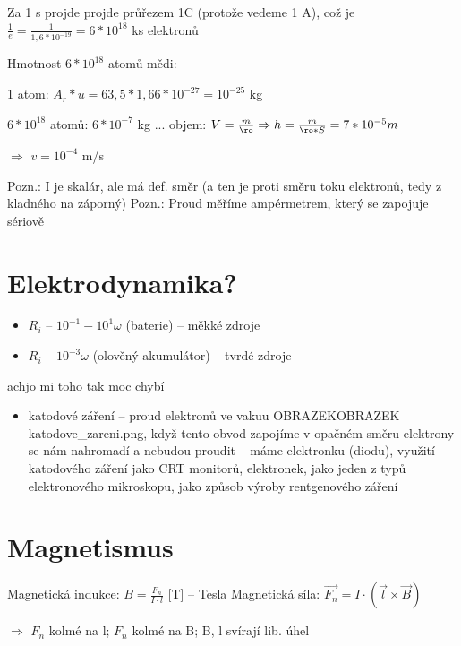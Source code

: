 \documentclass{article}
\begin{document}
Za 1 s projde projde průřezem 1C (protože vedeme 1 A), což je $\frac{1}{e} = \frac{1}{1,6* 10^{-19}} = 6* 10^{18}$ ks elektronů

Hmotnost $6*10^{18}$ atomů mědi:

  \hspace{10 px} 1 atom: $A_r * u = 63,5 * 1,66 * 10^{-27} = 10^{-25}$ kg

  \hspace{10 px} $6* 10^{18}$ atomů: $6* 10^{-7}$ kg ... objem: $V = \frac{m}{\ro} \Rightarrow h = \frac{m}{\ro*S} = 7* 10^{-5} m$

\hspace{-10 px} $\Rightarrow$ $v = 10^{-4} $ m/s

Pozn.: I je skalár, ale má def. směr (a ten je proti směru toku elektronů, tedy z kladného na záporný)
Pozn.: Proud měříme ampérmetrem, který se zapojuje sériově

\part{Elektrodynamika?}
\begin{itemize}
  \item $R_i$ -- $10^{-1} - 10^{1} \omega$ (baterie) -- měkké zdroje
  \item $R_i$ -- $10^{-3} \omega$ (olověný akumulátor) -- tvrdé zdroje
\end{itemize}

achjo mi toho tak moc chybí
\begin{itemize}
  \item katodové záření -- proud elektronů ve vakuu OBRAZEKOBRAZEK katodove\_zareni.png, když tento obvod zapojíme v opačném směru elektrony se nám nahromadí a nebudou proudit -- máme elektronku (diodu), využití katodového záření jako CRT monitorů, elektronek, jako jeden z typů elektronového mikroskopu, jako způsob výroby rentgenového záření
\end{itemize}

\newpage
\part{Magnetismus}

Magnetická indukce: $B = \frac{F_n}{I \cdot l}$ [T] -- Tesla \newline
Magnetická síla: $\overrightarrow{F_n} = I \cdot (\overrightarrow{l} \times \overrightarrow{B})$

$\Rightarrow$ $F_n$ kolmé na l; $F_n$ kolmé na B; B, l svírají lib. úhel
\end{document}
